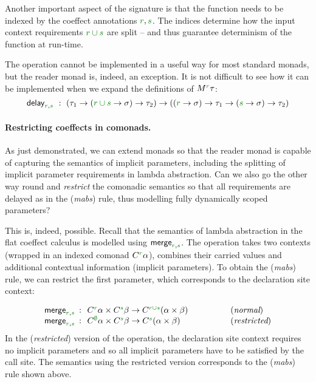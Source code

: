 Another important aspect of the signature is that the function needs to be indexed by the coeffect
annotations $\cclrd{r}, \cclrd{s}$. The indices determine how the input context requirements
$\cclrd{r \cup s}$ are split -- and thus guarantee determinism of the function at run-time.

The operation cannot be implemented in a useful way for most standard monads, but the 
reader monad is, indeed, an exception. It is not difficult to see how it can be implemented
when we expand the definitions of $\mtyp{\cclrd{r}}\tau$:
%
\begin{equation*}
\ident{delay}_{\cclrd{r}, \cclrd{s}}~:~
(\tau_1\rightarrow(\cclrd{r \cup s} \rightarrow \sigma) \rightarrow \tau_2) \rightarrow 
((\cclrd{r} \rightarrow \sigma) \rightarrow \tau_1\rightarrow(\cclrd{s} \rightarrow \sigma) \rightarrow \tau_2)
\end{equation*}

\paragraph{Restricting coeffects in comonads.} 
As just demonstrated, we can extend monads so that the reader monad is capable of capturing
the semantics of implicit parameters, including the splitting of implicit parameter requirements
in lambda abstraction. Can we also go the other way round and \emph{restrict} the comonadic
semantics so that all requirements are delayed as in the (\emph{mabs}) rule, thus modelling 
fully dynamically scoped parameters?

This is, indeed, possible. Recall that the semantics of lambda abstraction in the flat
coeffect calculus is modelled using $\ident{merge}_{\cclrd{r}, \cclrd{s}}$. The operation takes
two contexts (wrapped in an indexed comonad $\ctyp{\cclrd{r}}\alpha$), combines their carried 
values and additional contextual information (implicit parameters). To obtain the (\emph{mabs}) 
rule, we can restrict the first parameter, which corresponds to the declaration site context:

\begin{equation*}
\begin{array}{rcll}
 \ident{merge}_{\cclrd{r}, \cclrd{s}} &\narrow{:}& \ctyp{\cclrd{r}}\alpha \times \ctyp{\cclrd{s}}\beta \rightarrow \ctyp{\cclrd{r \cup s}}(\alpha \times \beta)
 &\hspace{4em}(\textit{normal}) \\
 \ident{merge}_{\cclrd{r}, \cclrd{s}} &\narrow{:}& \ctyp{\cclrd{\emptyset}}\alpha \times \ctyp{\cclrd{s}}\beta \rightarrow \ctyp{\cclrd{s}}(\alpha \times \beta)
 &\hspace{4em}(\textit{restricted})
\end{array} 
\end{equation*}
%
In the (\emph{restricted}) version of the operation, the declaration site context requires
no implicit parameters and so all implicit parameters have to be satisfied by the call site.
The semantics using the restricted version corresponds to the (\emph{mabs}) rule shown above.

